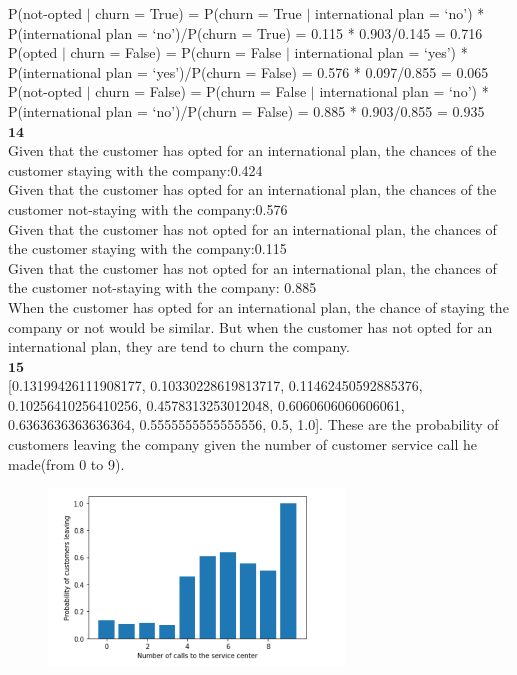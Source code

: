 \documentclass[12pt]{article}
\begin{document}
P(not-opted $ | $ churn = True) = P(churn = True $ | $ international plan = ‘no’) * P(international plan = ‘no’)/P(churn = True) = 0.115 * 0.903/0.145 = 0.716\\

P(opted $ | $ churn = False) = P(churn = False $ | $ international plan = ‘yes’) * P(international plan = ‘yes’)/P(churn = False) = 0.576 * 0.097/0.855 = 0.065\\

P(not-opted $ | $ churn = False) = P(churn = False $ | $ international plan = ‘no’) * P(international plan = ‘no’)/P(churn = False) = 0.885 * 0.903/0.855 = 0.935\\

$\textbf{14}$\\

Given that the customer has opted for an international plan, the chances of the customer staying with the company:0.424\\

Given that the customer has opted for an international plan, the chances of the customer not-staying with the company:0.576\\

Given that the customer has not opted for an international plan, the chances of the customer staying with the company:0.115\\

Given that the customer has not opted for an international plan, the chances of the customer not-staying with the company: 0.885\\

When the customer has opted for an international plan, the chance of staying the company or not would be similar. But when the customer has not opted for an international plan, they are tend to churn the company.\\

$\textbf{15}$\\

[0.13199426111908177, 0.10330228619813717, 0.11462450592885376, 0.10256410256410256, 0.4578313253012048, 0.6060606060606061, 0.6363636363636364, 0.5555555555555556, 0.5, 1.0]. These are the probability of customers leaving the company given the number of customer service call he made(from 0 to 9).\\
 
\begin{figure}[H] 
\centering 
\includegraphics[width=0.7\textwidth]{prob} 
\end{figure}
\end{document}

